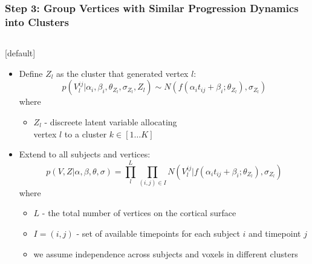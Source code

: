 \documentclass[8pt,xcolor=table]{beamer}
\begin{document}
\begin{frame}
\begin{columns}[T]
\begin{column}{.3\textwidth}
    \end{column}
  \end{columns}
  
  \vspace{6em}
  
% 
%   


\end{frame}



\begin{frame}
\frametitle{Step 3: Group Vertices with Similar Progression Dynamics into Clusters}

\begin{columns}[T]
    \begin{column}{.7\textwidth} %
   
    [default]
     
   \begin{itemize}      
      
      \item Define $Z_l$ as the cluster that generated vertex $l$:
      $$ p(V_l^{ij} | \alpha_i, \beta_i, \theta_{Z_l}, \sigma_{Z_l}, Z_l) \sim N(f(\alpha_i t_{ij} + \beta_i ; \theta_{Z_l}), \sigma_{Z_l}) $$
        where
	\begin{itemize}
	\item $Z_l$ - discreete latent variable allocating\\ vertex $l$ to a cluster $k \in [1 \dots K]$
	\end{itemize}
      \vspace{1em}
      \item Extend to all subjects and vertices:
  $$  p(V, Z | \alpha, \beta, \theta, \sigma) = \prod_l^L \prod_{(i,j) \in I} N(V_l^{ij} | f(\alpha_i t_{ij} + \beta_i ; \theta_{Z_l}), \sigma_{Z_l}) $$
  where
  \begin{itemize}
  \item $L$ - the total number of vertices on the cortical surface
  \item $I = {(i,j)}$ - set of available timepoints for each subject $i$ and timepoint $j$   
  \item we assume independence across subjects and voxels in different clusters
  \end{itemize}
     

\end{itemize}
\end{column}
\end{columns}
\end{frame}
\end{document}
